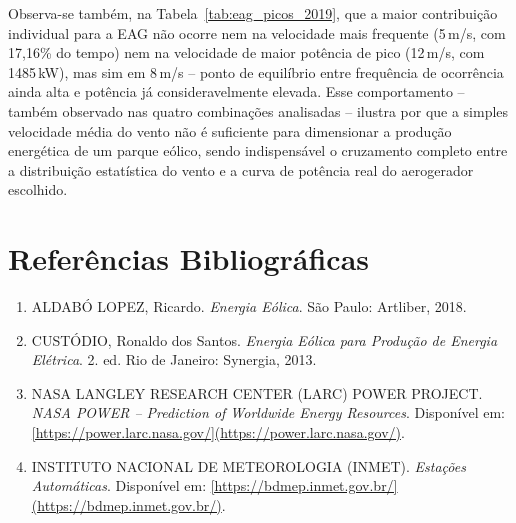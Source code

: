 \documentclass[11pt,a4paper]{article}
\begin{document}
Observa-se também, na Tabela~\ref{tab:eag_picos_2019}, que a maior
contribuição individual para a EAG não ocorre nem na velocidade mais
frequente (5\,m/s, com 17,16\% do tempo) nem na velocidade de maior
potência de pico (12\,m/s, com 1485\,kW), mas sim em 8\,m/s -- ponto de
equilíbrio entre frequência de ocorrência ainda alta e potência já
consideravelmente elevada. Esse comportamento -- também observado nas
quatro combinações analisadas -- ilustra por que a simples velocidade
média do vento não é suficiente para dimensionar a produção energética
de um parque eólico, sendo indispensável o cruzamento completo entre a
distribuição estatística do vento e a curva de potência real do
aerogerador escolhido.

\section*{Referências Bibliográficas}

\begin{enumerate}
    \item ALDABÓ LOPEZ, Ricardo. \emph{Energia Eólica}. São Paulo:
    Artliber, 2018.

    \item CUSTÓDIO, Ronaldo dos Santos. \emph{Energia Eólica para
    Produção de Energia Elétrica}. 2. ed. Rio de Janeiro: Synergia,
    2013.

    \item NASA LANGLEY RESEARCH CENTER (LARC) POWER PROJECT. \emph{NASA
    POWER -- Prediction of Worldwide Energy Resources}. Disponível em:
    \url{[https://power.larc.nasa.gov/](https://power.larc.nasa.gov/)}.

    \item INSTITUTO NACIONAL DE METEOROLOGIA (INMET). \emph{Estações Automáticas}. Disponível em:
    \url{[https://bdmep.inmet.gov.br/](https://bdmep.inmet.gov.br/)}.
\end{enumerate}
\end{document}
